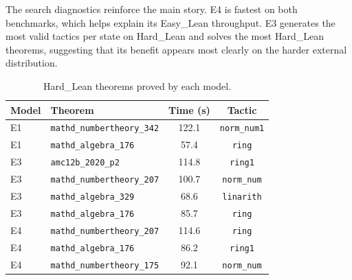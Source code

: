 \documentclass{article} %
\begin{document}
\begin{table}[H]
\centering
\caption{Search diagnostics.  Accepted action rate is parser/action acceptance during proof search, not a standalone proof-correctness metric.}
\label{tab:search-diagnostics}
\end{table}

The search diagnostics reinforce the main story.  E4 is fastest on both benchmarks, which helps explain its Easy\_Lean throughput.  E3 generates the most valid tactics per state on Hard\_Lean and solves the most Hard\_Lean theorems, suggesting that its benefit appears most clearly on the harder external distribution.

\begin{table}[H]
\centering
\caption{Hard\_Lean theorems proved by each model.}
\small
\begin{tabular}{llcc}
\toprule
\textbf{Model} & \textbf{Theorem} & \textbf{Time (s)} & \textbf{Tactic} \\
\midrule
E1 & \texttt{mathd\_numbertheory\_342} & 122.1 & \texttt{norm\_num1} \\
E1 & \texttt{mathd\_algebra\_176} & 57.4 & \texttt{ring} \\
E3 & \texttt{amc12b\_2020\_p2} & 114.8 & \texttt{ring1} \\
E3 & \texttt{mathd\_numbertheory\_207} & 100.7 & \texttt{norm\_num} \\
E3 & \texttt{mathd\_algebra\_329} & 68.6 & \texttt{linarith} \\
E3 & \texttt{mathd\_algebra\_176} & 85.7 & \texttt{ring} \\
E4 & \texttt{mathd\_numbertheory\_207} & 114.6 & \texttt{ring} \\
E4 & \texttt{mathd\_algebra\_176} & 86.2 & \texttt{ring1} \\
E4 & \texttt{mathd\_numbertheory\_175} & 92.1 & \texttt{norm\_num} \\
\bottomrule
\end{tabular}
\label{tab:hard-lean-proved}
\end{table}
\end{document}
